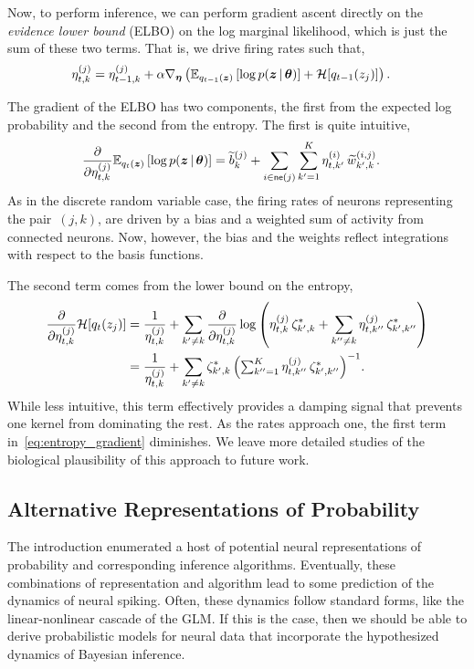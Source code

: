 Now, to perform inference, we can perform gradient ascent directly on the
\emph{evidence lower bound} (ELBO) on the log marginal likelihood,
which is just the sum of these two terms. That is, we drive firing
rates such that,
\begin{align*}
  \eta_{t,k}^{(j)} %
  &= \eta_{t-1,k}^{(j)} +
  \alpha \nabla_{\boldsymbol{\eta}} \left( \bbE_{q_{t-1}(\bz)} \left[ \log p(\bz \given \btheta) \right] + \mcH[q_{t-1}(z_j)] \right).
\end{align*}

The gradient of the ELBO has two components, the first from the
expected log probability and the second from the entropy. The first is
quite intuitive,
\begin{align*}
  \frac{\partial}{\partial \eta_{t,k}^{(j)}} \mathbb{E}_{q_t(\boldsymbol{z})} \left[ \log p(\boldsymbol{z} \,|\, \boldsymbol{\theta}) \right]
  &=
  \widetilde{b}_k^{(j)} +
  \sum_{i \in \mathsf{ne}(j)} \sum_{k'=1}^K \eta_{t,k'}^{(i)} \, \widetilde{w}_{k',k}^{(i,j)}.
\end{align*} 
As in the discrete random variable case, the firing rates of neurons representing
the pair~$(j,k)$, are driven by a bias and a weighted sum of activity from
connected neurons. Now, however, the bias and the weights reflect integrations
with respect to the basis functions.

The second term comes from the lower bound on the entropy, 
\begin{align}
  \nonumber
  \frac{\partial}{\partial \eta_{t,k}^{(j)}} \mathcal{H}[q_t(z_j)] 
  &=
  \frac{1}{\eta_{t,k}^{(j)}}
  + \sum_{k' \neq k} \frac{\partial}{\partial \eta_{t,k}^{(j)}}
  \log \left( \eta_{t,k}^{(j)} \, \zeta_{k',k}^\ast
  + \sum_{k''\neq k} \eta_{t,k''}^{(j)} \, \zeta_{k',k''}^\ast \right) \\
  \label{eq:entropy_gradient}
  &= \frac{1}{\eta_{t,k}^{(j)}}
  + \sum_{k'\neq k}
  {\zeta^{\ast}_{k',k}} \,
  \Big({\textstyle{\sum}_{k''=1}^K \, \eta_{t,k''}^{(j)} \, \zeta_{k',k''}^\ast} \Big)^{-1}.
\end{align}
While less intuitive, this term effectively provides a damping 
signal that prevents one kernel from dominating the rest. As the
rates approach one, the first term in~\eqref{eq:entropy_gradient}
diminishes. We leave more detailed studies of the biological plausibility
of this approach to future work.

\subsection{Alternative Representations of Probability}
The introduction enumerated a host of potential neural representations
of probability and corresponding inference algorithms. Eventually, these
combinations of representation and algorithm lead to some prediction of
the dynamics of neural spiking. Often, these dynamics follow standard forms,
like the linear-nonlinear cascade of the GLM. If this is the case, then
we should be able to derive probabilistic models for neural data that
incorporate the hypothesized dynamics of Bayesian inference.

